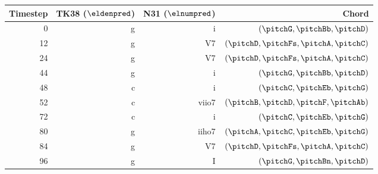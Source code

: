 \begin{tabular}{r|rrr}
Timestep & TK38 ($\eldenpred$)     & N31 ($\elnumpred$) & Chord \\ \hline
0        & g                       & i                  & $(\pitchG, \pitchBb, \pitchD)$   \\
12       & g                       & V7                 & $(\pitchD, \pitchFs, \pitchA, \pitchC)$   \\
24       & g                       & V7                 & $(\pitchD, \pitchFs, \pitchA, \pitchC)$   \\
44       & g                       & i                  & $(\pitchG, \pitchBb, \pitchD)$   \\ \hline
48       & c                       & i                  & $(\pitchC, \pitchEb, \pitchG)$   \\
52       & c                       & viio7              & $(\pitchB, \pitchD, \pitchF, \pitchAb)$   \\
72       & c                       & i                  & $(\pitchC, \pitchEb, \pitchG)$   \\
80       & g                       & iiho7              & $(\pitchA, \pitchC, \pitchEb, \pitchG)$   \\
84       & g                       & V7                 & $(\pitchD, \pitchFs, \pitchA, \pitchC)$   \\
96       & g                       & I                  & $(\pitchG, \pitchBn, \pitchD)$   \\
\end{tabular}
